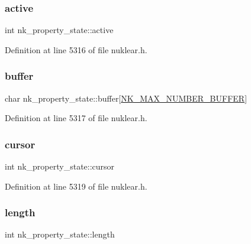 \subsubsection{\texorpdfstring{active}{active}}
{\footnotesize\ttfamily int nk\+\_\+property\+\_\+state\+::active}



Definition at line 5316 of file nuklear.\+h.

\mbox{\label{structnk__property__state_aba9b0d6a242c09b6c949f933a3c4d6c0}} 
\subsubsection{\texorpdfstring{buffer}{buffer}}
{\footnotesize\ttfamily char nk\+\_\+property\+\_\+state\+::buffer\mbox{[}\mbox{\hyperlink{nuklear_8h_ad77efd6e24a599928777c715d0b2792b}{N\+K\+\_\+\+M\+A\+X\+\_\+\+N\+U\+M\+B\+E\+R\+\_\+\+B\+U\+F\+F\+ER}}\mbox{]}}



Definition at line 5317 of file nuklear.\+h.

\mbox{\label{structnk__property__state_a39f7b5ce4bacdc4dc826c13081b13a16}} 
\subsubsection{\texorpdfstring{cursor}{cursor}}
{\footnotesize\ttfamily int nk\+\_\+property\+\_\+state\+::cursor}



Definition at line 5319 of file nuklear.\+h.

\mbox{\label{structnk__property__state_a7fb78c3d605eeda826192d5cb52bc65a}} 
\subsubsection{\texorpdfstring{length}{length}}
{\footnotesize\ttfamily int nk\+\_\+property\+\_\+state\+::length}



